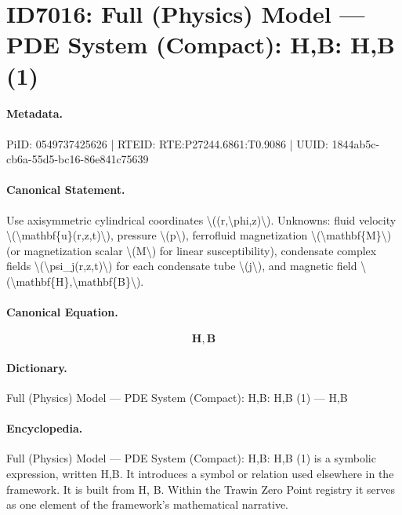 \section*{ID7016: Full (Physics) Model — PDE System (Compact): H,B: H,B (1)}
\paragraph{Metadata.}
PiID: 0549737425626 | RTEID: RTE:P27244.6861:T0.9086 | UUID: 1844ab5c-cb6a-55d5-bc16-86e841c75639

\paragraph{Canonical Statement.}
Use axisymmetric cylindrical coordinates \textbackslash{}((r,\textbackslash{}phi,z)\textbackslash{}). Unknowns: fluid velocity \textbackslash{}(\textbackslash{}mathbf\{u\}(r,z,t)\textbackslash{}), pressure \textbackslash{}(p\textbackslash{}), ferrofluid magnetization \textbackslash{}(\textbackslash{}mathbf\{M\}\textbackslash{}) (or magnetization scalar \textbackslash{}(M\textbackslash{}) for linear susceptibility), condensate complex fields \textbackslash{}(\textbackslash{}psi\_j(r,z,t)\textbackslash{}) for each condensate tube \textbackslash{}(j\textbackslash{}), and magnetic field \textbackslash{}(\textbackslash{}mathbf\{H\},\textbackslash{}mathbf\{B\}\textbackslash{}).

\paragraph{Canonical Equation.}
\[
\mathbf{H},\mathbf{B}
\]

\paragraph{Dictionary.}
Full (Physics) Model — PDE System (Compact): H,B: H,B (1) — H,B

\paragraph{Encyclopedia.}
Full (Physics) Model — PDE System (Compact): H,B: H,B (1) is a symbolic expression, written H,B. It introduces a symbol or relation used elsewhere in the framework. It is built from H, B. Within the Trawin Zero Point registry it serves as one element of the framework's mathematical narrative.
